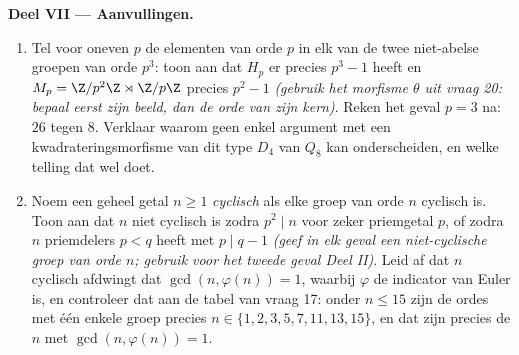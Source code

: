 \begin{problem}
\medskip
\noindent\textbf{Deel VII --- Aanvullingen.}
\begin{enumerate}[resume]
  \item Tel voor oneven $p$ de elementen van orde $p$ in elk van de
        twee niet-abelse groepen van orde $p^3$: toon aan dat $H_p$
        er precies $p^3 - 1$ heeft en $M_p = \Z/p^2\Z \rtimes
        \Z/p\Z$ precies $p^2 - 1$ \emph{(gebruik het morfisme
        $\theta$ uit vraag 20: bepaal eerst zijn beeld, dan de orde
        van zijn kern)}. Reken het geval $p = 3$ na: $26$ tegen
        $8$. Verklaar waarom geen enkel argument met een
        kwadrateringsmorfisme van dit type $D_4$ van $Q_8$ kan
        onderscheiden, en welke telling dat wel doet.
  \item Noem een geheel getal $n \geq 1$ \emph{cyclisch} als elke
        groep van orde $n$ cyclisch is. Toon aan dat $n$ niet
        cyclisch is zodra $p^2 \mid n$ voor zeker priemgetal $p$,
        of zodra $n$ priemdelers $p < q$ heeft met $p \mid q - 1$
        \emph{(geef in elk geval een niet-cyclische groep van orde
        $n$; gebruik voor het tweede geval Deel II)}. Leid af dat
        $n$ cyclisch afdwingt dat $\gcd(n, \varphi(n)) = 1$, waarbij
        $\varphi$ de indicator van Euler is, en controleer dat aan
        de tabel van vraag 17: onder $n \leq 15$ zijn de ordes met
        één enkele groep precies $n \in \{1, 2, 3, 5, 7, 11, 13,
        15\}$, en dat zijn precies de $n$ met $\gcd(n, \varphi(n))
        = 1$.
\end{enumerate}
\end{problem}
